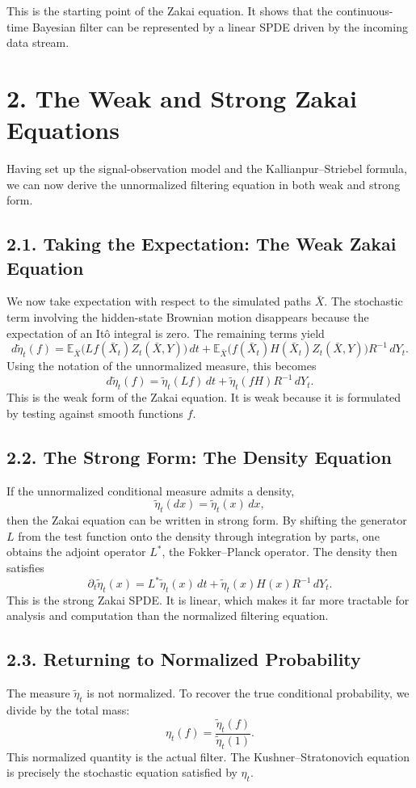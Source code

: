 \documentclass[11pt]{article}
\theoremstyle{definition}
\theoremstyle{remark}
\begin{document}
This is the starting point of the Zakai equation. It shows that the continuous-time Bayesian filter can be represented by a linear SPDE driven by the incoming data stream.

\section*{2. The Weak and Strong Zakai Equations}
Having set up the signal-observation model and the Kallianpur--Striebel formula, we can now derive the unnormalized filtering equation in both weak and strong form.

\subsection*{2.1. Taking the Expectation: The Weak Zakai Equation}
We now take expectation with respect to the simulated paths \(\bar X\). The stochastic term involving the hidden-state Brownian motion disappears because the expectation of an It\^o integral is zero. The remaining terms yield
\[
d\widetilde\eta_t(f)
=
\mathbb E_{\bar X}\bigl(Lf(\bar X_t)Z_t(\bar X,Y)\bigr)\,dt
+
\mathbb E_{\bar X}\bigl(f(\bar X_t)H(\bar X_t)Z_t(\bar X,Y)\bigr)R^{-1}\,dY_t.
\]
Using the notation of the unnormalized measure, this becomes
\[
d\widetilde\eta_t(f)
=
\widetilde\eta_t(Lf)\,dt
+
\widetilde\eta_t(fH)R^{-1}\,dY_t.
\]
This is the weak form of the Zakai equation. It is weak because it is formulated by testing against smooth functions \(f\).

\subsection*{2.2. The Strong Form: The Density Equation}
If the unnormalized conditional measure admits a density,
\[
\widetilde\eta_t(dx)=\widetilde\eta_t(x)\,dx,
\]
then the Zakai equation can be written in strong form. By shifting the generator \(L\) from the test function onto the density through integration by parts, one obtains the adjoint operator \(L^*\), the Fokker--Planck operator. The density then satisfies
\[
\partial_t \widetilde\eta_t(x)
=
L^*\widetilde\eta_t(x)\,dt
+
\widetilde\eta_t(x)H(x)R^{-1}\,dY_t.
\]
This is the strong Zakai SPDE. It is linear, which makes it far more tractable for analysis and computation than the normalized filtering equation.

\subsection*{2.3. Returning to Normalized Probability}
The measure \(\widetilde\eta_t\) is not normalized. To recover the true conditional probability, we divide by the total mass:
\[
\eta_t(f)
=
\frac{\widetilde\eta_t(f)}{\widetilde\eta_t(1)}.
\]
This normalized quantity is the actual filter. The Kushner--Stratonovich equation is precisely the stochastic equation satisfied by \(\eta_t\).
\end{document}
